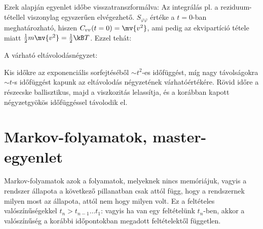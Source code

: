   Ezek alapján  egyenlet időbe visszatranszformálva:
  Az integrálás pl. a reziduum-tétellel viszonylag egyszerűen elvégezhető. $S_{\varphi\varphi}$ értéke a $t=0$-ban meghatározható, hiszen $C_{vv}(t=0)=\mv{v^2}$, ami pedig az ekvipartíció tétele miatt $\frac{1}{2}m\mv{v^2}=\frac{1}{2}\kB T$.
   Ezzel tehát:
  
  A várható eltávolodásnégyzet:
  
  Kis időkre az exponenciális sorfejtéséből $\sim t^2$-es időfüggést, míg nagy távolságokra $\sim t$-s időfüggést kapunk az eltávolodás négyzetének várhatóértékére.
   Rövid időre a részecske ballisztikus, majd a viszkozitás lelassítja, és a korábban kapott négyzetgyökös időfüggéssel távolodik el. 
  
  \section{Markov-folyamatok, master-egyenlet}
   
   Markov-folyamatok azok a folyamatok, melyeknek nincs memóriájuk, vagyis a rendszer állapota a következő pillanatban csak attól függ, hogy a rendszernek milyen most az állapota, attól nem hogy milyen volt.
   Ez a feltételes valószínűségekkel $t_n>t_{n-1}\dots t_1$:
   vagyis ha van egy feltételünk $t_n$-ben, akkor a valószínűség a korábbi időpontokban megadott feltételektől független.
   
